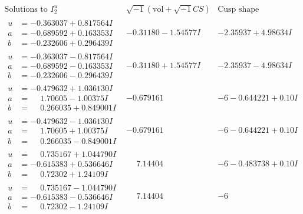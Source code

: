 \documentclass[1p]{elsarticle_modified}
\theoremstyle{definition}
\newcommand{\I}{\sqrt{-1}}
\begin{document}
$$\begin{array}{c|c|c}  
\text{Solutions to }I^u_{2}& \I (\text{vol} + \sqrt{-1}CS) & \text{Cusp shape}\\
 \hline 
\begin{aligned}
u &= -0.363037 + 0.817564 I \\
a &= -0.689592 + 0.163353 I \\
b &= -0.232606 + 0.296439 I\end{aligned}
 & -0.31180 - 1.54577 I & -2.35937 + 4.98634 I \\ \hline\begin{aligned}
u &= -0.363037 - 0.817564 I \\
a &= -0.689592 - 0.163353 I \\
b &= -0.232606 - 0.296439 I\end{aligned}
 & -0.31180 + 1.54577 I & -2.35937 - 4.98634 I \\ \hline\begin{aligned}
u &= -0.479632 + 1.036130 I \\
a &= \phantom{-}1.70605 - 1.00375 I \\
b &= \phantom{-}0.266035 + 0.849001 I\end{aligned}
 & -0.679161\phantom{ +0.000000I} &                  -6
-0.644221 + 0. 10   I\phantom{ +0.000000I} \\ \hline\begin{aligned}
u &= -0.479632 - 1.036130 I \\
a &= \phantom{-}1.70605 + 1.00375 I \\
b &= \phantom{-}0.266035 - 0.849001 I\end{aligned}
 & -0.679161\phantom{ +0.000000I} &                  -6
-0.644221 + 0. 10   I\phantom{ +0.000000I} \\ \hline\begin{aligned}
u &= \phantom{-}0.735167 + 1.044790 I \\
a &= -0.615383 + 0.536646 I \\
b &= \phantom{-}0.72302 + 1.24109 I\end{aligned}
 & \phantom{-}7.14404\phantom{ +0.000000I} &                  -6
-0.483738 + 0. 10   I\phantom{ +0.000000I} \\ \hline\begin{aligned}
u &= \phantom{-}0.735167 - 1.044790 I \\
a &= -0.615383 - 0.536646 I \\
b &= \phantom{-}0.72302 - 1.24109 I\end{aligned}
 & \phantom{-}7.14404\phantom{ +0.000000I} &                  -6

\end{array}$$
\end{document}
